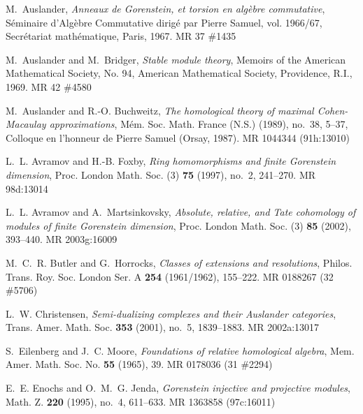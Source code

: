 \documentclass{amsart}
\begin{document}
\providecommand{\bysame}{\leavevmode\hbox to3em{\hrulefill}\thinspace}
\providecommand{\MR}{\relax\ifhmode\unskip\space\fi MR }
\providecommand{\MRhref}[2]{  \href{http://www.ams.org/mathscinet-getitem?mr=#1}{#2}
}
\providecommand{\href}[2]{#2}
\begin{thebibliography}{10}

M.~Auslander, \emph{Anneaux de {G}orenstein, et torsion en alg\`ebre
  commutative}, S\'eminaire d'Alg\`ebre Commutative dirig\'e par Pierre Samuel,
  vol. 1966/67, Secr\'etariat math\'ematique, Paris, 1967. \MR{37 \#1435}

M.~Auslander and M.~Bridger, \emph{Stable module theory}, Memoirs of the
  American Mathematical Society, No. 94, American Mathematical Society,
  Providence, R.I., 1969. \MR{42 \#4580}

M.~Auslander and R.-O. Buchweitz, \emph{The homological theory of maximal
  {C}ohen-{M}acaulay approximations}, M\'em. Soc. Math. France (N.S.) (1989),
  no.~38, 5--37, Colloque en l'honneur de Pierre Samuel (Orsay, 1987).
  \MR{1044344 (91h:13010)}

L.~L. Avramov and H.-B. Foxby, \emph{Ring homomorphisms and finite {G}orenstein
  dimension}, Proc. London Math. Soc. (3) \textbf{75} (1997), no.~2, 241--270.
  \MR{98d:13014}

L.~L. Avramov and A.~Martsinkovsky, \emph{Absolute, relative, and {T}ate
  cohomology of modules of finite {G}orenstein dimension}, Proc. London Math.
  Soc. (3) \textbf{85} (2002), 393--440. \MR{2003g:16009}

M.~C.~R. Butler and G.~Horrocks, \emph{Classes of extensions and resolutions},
  Philos. Trans. Roy. Soc. London Ser. A \textbf{254} (1961/1962), 155--222.
  \MR{0188267 (32 \#5706)}

L.~W. Christensen, \emph{Semi-dualizing complexes and their {A}uslander
  categories}, Trans. Amer. Math. Soc. \textbf{353} (2001), no.~5, 1839--1883.
  \MR{2002a:13017}

S.~Eilenberg and J.~C. Moore, \emph{Foundations of relative homological
  algebra}, Mem. Amer. Math. Soc. No. \textbf{55} (1965), 39. \MR{0178036 (31
  \#2294)}

E.~E. Enochs and O.~M.~G. Jenda, \emph{Gorenstein injective and projective
  modules}, Math. Z. \textbf{220} (1995), no.~4, 611--633. \MR{1363858
  (97c:16011)}


\end{thebibliography}
\end{document}
